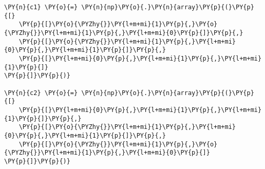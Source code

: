 \begin{tcolorbox}[breakable, size=fbox, boxrule=1pt, pad at break*=1mm,colback=cellbackground, colframe=cellborder]
\begin{Verbatim}[commandchars=\\\{\}]
\PY{n}{c1} \PY{o}{=} \PY{n}{np}\PY{o}{.}\PY{n}{array}\PY{p}{(}\PY{p}{[}
    \PY{p}{[}\PY{o}{\PYZhy{}}\PY{l+m+mi}{1}\PY{p}{,}\PY{o}{\PYZhy{}}\PY{l+m+mi}{1}\PY{p}{,}\PY{l+m+mi}{0}\PY{p}{]}\PY{p}{,}
    \PY{p}{[}\PY{o}{\PYZhy{}}\PY{l+m+mi}{1}\PY{p}{,}\PY{l+m+mi}{0}\PY{p}{,}\PY{l+m+mi}{1}\PY{p}{]}\PY{p}{,}
    \PY{p}{[}\PY{l+m+mi}{0}\PY{p}{,}\PY{l+m+mi}{1}\PY{p}{,}\PY{l+m+mi}{1}\PY{p}{]}
\PY{p}{]}\PY{p}{)}

\PY{n}{c2} \PY{o}{=} \PY{n}{np}\PY{o}{.}\PY{n}{array}\PY{p}{(}\PY{p}{[}
    \PY{p}{[}\PY{l+m+mi}{0}\PY{p}{,}\PY{l+m+mi}{1}\PY{p}{,}\PY{l+m+mi}{1}\PY{p}{]}\PY{p}{,}
    \PY{p}{[}\PY{o}{\PYZhy{}}\PY{l+m+mi}{1}\PY{p}{,}\PY{l+m+mi}{0}\PY{p}{,}\PY{l+m+mi}{1}\PY{p}{]}\PY{p}{,}
    \PY{p}{[}\PY{o}{\PYZhy{}}\PY{l+m+mi}{1}\PY{p}{,}\PY{o}{\PYZhy{}}\PY{l+m+mi}{1}\PY{p}{,}\PY{l+m+mi}{0}\PY{p}{]}
\PY{p}{]}\PY{p}{)}


\end{Verbatim}
\end{tcolorbox}
